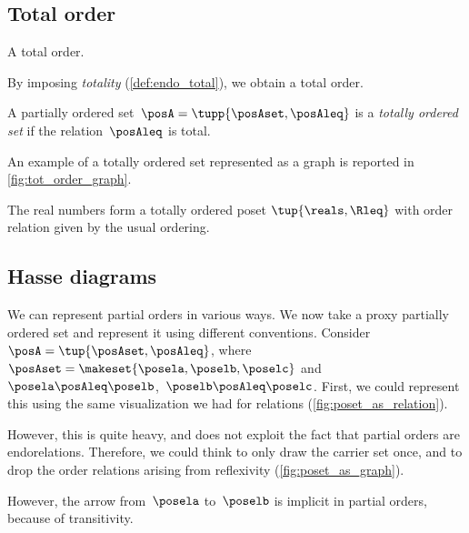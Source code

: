 \vfill

\subsection{Total order}
\begin{marginfigure}
    \centering
    \caption{A total order.}
    \label{fig:tot_order_graph}
\end{marginfigure}
By imposing \emph{totality} (\cref{def:endo_total}), we obtain a total order.

\begin{ctdefinition}
    \label{def:total_order}
    A partially ordered set~$\posA = \tupp{\posAset,\posAleq}$ is a \emph{totally ordered set} if the relation~$\posAleq$ is total.
\end{ctdefinition}

An example of a totally ordered set represented as a graph is reported in \cref{fig:tot_order_graph}.

\begin{example}[Reals]
    The real numbers \reals form a totally ordered poset $\tup{\reals, \Rleq}$ with order relation given by the usual ordering.
\end{example}
\vfill
\clearpage

\subsection{Hasse diagrams}
We can represent partial orders in various ways.
We now take a proxy partially ordered set and represent it using different conventions.
Consider~$\posA=\tup{\posAset,\posAleq}$, where~$\posAset=\makeset{\posela,\poselb,\poselc}$ and~$\posela\posAleq \poselb$,~$\poselb\posAleq \poselc$.
First, we could represent this using the same visualization we had for relations (\cref{fig:poset_as_relation}).

However, this is quite heavy, and does not exploit the fact that partial orders are endorelations.
Therefore, we could think to only draw the carrier set once, and to drop the order relations arising from reflexivity (\cref{fig:poset_as_graph}).

However, the arrow from~$\posela$ to~$\poselb$ is implicit in partial orders, because of transitivity.

